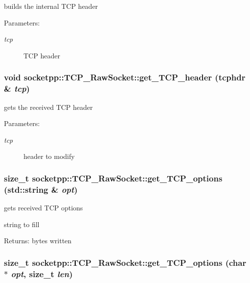builds the internal TCP header 

\begin{Desc}
\item[Parameters:]
\begin{description}
\item[{\em tcp}]TCP header \end{description}
\end{Desc}
\hypertarget{classsocketpp_1_1TCP__RawSocket_d7e8b2a67c856e11f0e6cfff5f8b8705}{
\subsubsection[{get\_\-TCP\_\-header}]{\setlength{\rightskip}{0pt plus 5cm}void socketpp::TCP\_\-RawSocket::get\_\-TCP\_\-header (tcphdr \& {\em tcp})}}
\label{classsocketpp_1_1TCP__RawSocket_d7e8b2a67c856e11f0e6cfff5f8b8705}


gets the received TCP header 

\begin{Desc}
\item[Parameters:]
\begin{description}
\item[{\em tcp}]header to modify \end{description}
\end{Desc}
\hypertarget{classsocketpp_1_1TCP__RawSocket_67ab79f764a710067590427cb35aeea0}{
\subsubsection[{get\_\-TCP\_\-options}]{\setlength{\rightskip}{0pt plus 5cm}size\_\-t socketpp::TCP\_\-RawSocket::get\_\-TCP\_\-options (std::string \& {\em opt})}}
\label{classsocketpp_1_1TCP__RawSocket_67ab79f764a710067590427cb35aeea0}


gets received TCP options 

string to fill \begin{Desc}
\item[Returns:]bytes written \end{Desc}
\hypertarget{classsocketpp_1_1TCP__RawSocket_75e954caea8187c5077821cd449199e7}{
\subsubsection[{get\_\-TCP\_\-options}]{\setlength{\rightskip}{0pt plus 5cm}size\_\-t socketpp::TCP\_\-RawSocket::get\_\-TCP\_\-options (char $\ast$ {\em opt}, \/  size\_\-t {\em len})}}
\label{classsocketpp_1_1TCP__RawSocket_75e954caea8187c5077821cd449199e7}


